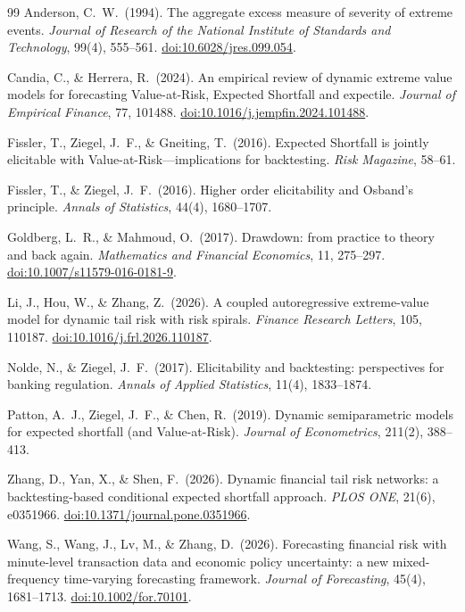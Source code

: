 \documentclass[11pt]{article}
\begin{document}
\begin{thebibliography}{99}
\small
{} Anderson, C.\ W.\ (1994). The aggregate excess measure of severity
of extreme events. \emph{Journal of Research of the National Institute of Standards and Technology},
99(4), 555--561. \href{https://doi.org/10.6028/jres.099.054}{doi:10.6028/jres.099.054}.

 Candia, C., \& Herrera, R.\ (2024). An empirical
review of dynamic extreme value models for forecasting Value-at-Risk, Expected Shortfall and expectile.
\emph{Journal of Empirical Finance}, 77, 101488.
\href{https://doi.org/10.1016/j.jempfin.2024.101488}{doi:10.1016/j.jempfin.2024.101488}.

 Fissler, T., Ziegel, J.\ F., \& Gneiting, T.\ (2016). Expected
Shortfall is jointly elicitable with Value-at-Risk---implications for backtesting. \emph{Risk Magazine},
58--61.

 Fissler, T., \& Ziegel, J.\ F.\ (2016). Higher order
elicitability and Osband's principle. \emph{Annals of Statistics}, 44(4), 1680--1707.

 Goldberg, L.\ R., \& Mahmoud, O.\ (2017).
Drawdown: from practice to theory and back again. \emph{Mathematics and Financial Economics}, 11, 275--297.
\href{https://doi.org/10.1007/s11579-016-0181-9}{doi:10.1007/s11579-016-0181-9}.

 Li, J., Hou, W., \& Zhang, Z.\ (2026). A coupled autoregressive
extreme-value model for dynamic tail risk with risk spirals. \emph{Finance Research Letters}, 105, 110187.
\href{https://doi.org/10.1016/j.frl.2026.110187}{doi:10.1016/j.frl.2026.110187}.

 Nolde, N., \& Ziegel, J.\ F.\ (2017). Elicitability and
backtesting: perspectives for banking regulation. \emph{Annals of Applied Statistics}, 11(4), 1833--1874.

 Patton, A.\ J., Ziegel, J.\ F., \& Chen, R.\ (2019). Dynamic
semiparametric models for expected shortfall (and Value-at-Risk). \emph{Journal of Econometrics}, 211(2),
388--413.

 Zhang, D., Yan, X., \& Shen, F.\ (2026). Dynamic financial
tail risk networks: a backtesting-based conditional expected shortfall approach. \emph{PLOS ONE}, 21(6),
e0351966. \href{https://doi.org/10.1371/journal.pone.0351966}{doi:10.1371/journal.pone.0351966}.

 Wang, S., Wang, J., Lv, M., \& Zhang, D.\ (2026). Forecasting
financial risk with minute-level transaction data and economic policy uncertainty: a new mixed-frequency
time-varying forecasting framework. \emph{Journal of Forecasting}, 45(4), 1681--1713.
\href{https://doi.org/10.1002/for.70101}{doi:10.1002/for.70101}.
\end{thebibliography}
\end{document}
